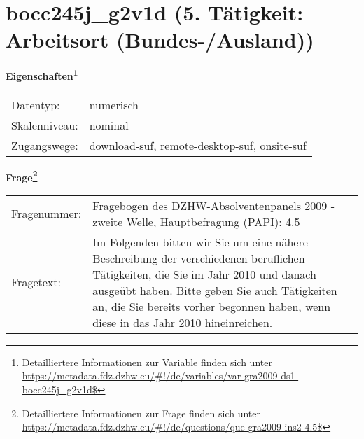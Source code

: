 
    \setcounter{footnote}{0}

    \vspace*{-1.8cm}
	\section{bocc245j\_g2v1d (5. Tätigkeit: Arbeitsort (Bundes-/Ausland))}
	\label{section:bocc245j_g2v1d}



    \vspace*{0.5cm}
    \noindent\textbf{Eigenschaften\footnote{Detailliertere Informationen zur Variable finden sich unter
		\url{https://metadata.fdz.dzhw.eu/\#!/de/variables/var-gra2009-ds1-bocc245j_g2v1d$}}}\\
	\begin{tabularx}{\hsize}{@{}lX}
	Datentyp: & numerisch \\
	Skalenniveau: & nominal \\
	Zugangswege: &
	  download-suf, 
	  remote-desktop-suf, 
	  onsite-suf
 \\
    \end{tabularx}



				\vspace*{0.5cm}
                \noindent\textbf{Frage\footnote{Detailliertere Informationen zur Frage finden sich unter
		              \url{https://metadata.fdz.dzhw.eu/\#!/de/questions/que-gra2009-ins2-4.5$}}}\\
				\begin{tabularx}{\hsize}{@{}lX}
					Fragenummer: &
					  Fragebogen des DZHW-Absolventenpanels 2009 - zweite Welle, Hauptbefragung (PAPI):
					  4.5
 \\
					Fragetext: & Im Folgenden bitten wir Sie um eine nähere Beschreibung der verschiedenen beruflichen Tätigkeiten, die Sie im Jahr 2010 und danach ausgeübt haben. Bitte geben Sie auch Tätigkeiten an, die Sie bereits vorher begonnen haben, wenn diese in das Jahr 2010 hineinreichen. \\
				\end{tabularx}





